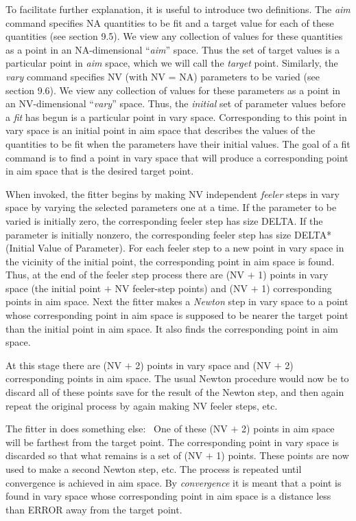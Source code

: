 To facilitate further explanation, it is useful to introduce two definitions.  The {\em aim} command specifies NA quantities to be fit and a target value for each of these quantities (see section 9.5).  We view any collection of values for these quantities as a point in an NA-dimensional ``{\em aim}'' space.  Thus the set of target values is a particular point in {\em aim} space, which we will call the {\em target} point.  Similarly, the {\em vary} command specifies NV (with NV = NA) parameters to be varied (see section 9.6).  We view any collection of values for these parameters as a point in an NV-dimensional ``{\em vary}'' space.  Thus, the {\em initial} set of parameter values before a {\em fit} has begun is a particular point in vary space.  Corresponding to this point in vary space is an initial point in aim space that describes the values of the quantities to be fit when the parameters have their initial values.  The goal of a fit command is to find a point in vary space that will produce a corresponding point in aim space that is the desired target point.

When invoked, the fitter begins by making NV independent {\em feeler} steps in vary space by varying the selected parameters one at a time.  If the parameter to be varied is initially zero, the corresponding feeler step has size DELTA.  If the parameter is initially nonzero, the corresponding feeler step has size DELTA*(Initial Value of Parameter).  For each feeler step to a new point in vary space in the vicinity of the initial point, the corresponding point in aim space is found.  Thus, at the end of the feeler step process there are (NV $+$ 1) points in vary space (the initial point $+$ NV feeler-step points) and (NV $+$ 1) corresponding points in aim space.  Next the fitter makes a {\em Newton} step in vary space to a point whose corresponding point in aim space is supposed to be nearer the target point than the initial point in aim space.  It also finds the corresponding point in aim space.

At this stage there are (NV $+$ 2) points in vary space and (NV $+$ 2) corresponding points in aim space.  The usual Newton procedure would now be to discard all of these points save for the result of the Newton step, and then again repeat the original process by again making NV feeler steps, etc.

The fitter in \Mary does something else: \ One of these (NV $+$ 2) points in aim space will be farthest from the target point.  The corresponding point in vary space is discarded so that what remains is a set of (NV $+$ 1) points. These points  are now used to make a second Newton step, etc.  The process is repeated until convergence is achieved in aim space.  By {\em convergence} it is meant that a point is found in vary space whose corresponding point in aim space is a distance less than ERROR away from the target point.


